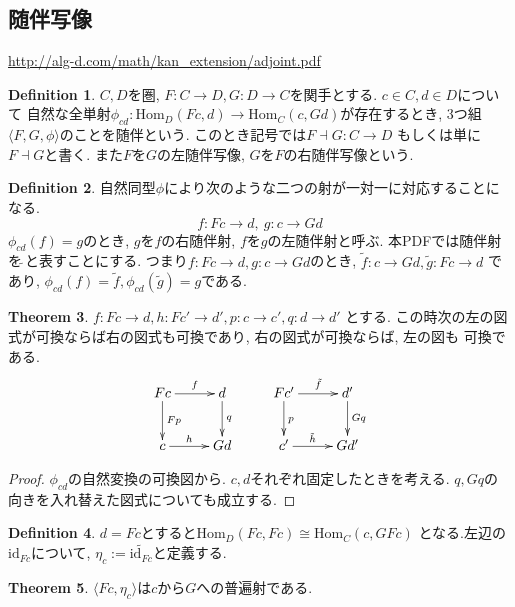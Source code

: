 \documentclass[a4paper,10pt]{article}
\theoremstyle{definition}
\newtheorem{thm}{\bfseries Theorem}[section]
\newtheorem{definition}[thm]{\bfseries Definition}
\begin{document}
\subsection{随伴写像}
\url{http://alg-d.com/math/kan_extension/adjoint.pdf}
\begin{definition}
    $C, D$を圏, $F: C \rightarrow D, G: D \rightarrow C$を関手とする. $c \in C, d \in D$について
    自然な全単射$\phi_{cd}: \mathrm{Hom}_D(Fc, d) \rightarrow \mathrm{Hom}_C(c,Gd)$が存在するとき,
    3つ組$\langle F,G,\phi \rangle$のことを随伴という. このとき記号では$F \dashv G: C \rightarrow D$
    もしくは単に$F \dashv G$と書く. また$F$を$G$の左随伴写像, $G$を$F$の右随伴写像という.
\end{definition}
\begin{definition}
    自然同型$\phi$により次のような二つの射が一対一に対応することになる.
    \[ f:Fc \rightarrow d, \ g:c \rightarrow Gd \]
    $\phi_{cd}(f) = g$のとき, $g$を$f$の右随伴射, $f$を$g$の左随伴射と呼ぶ.
    本PDFでは随伴射を$\tilde{\ }$と表すことにする. つまり$f:Fc \rightarrow d, g:
    c \rightarrow Gd$のとき, $\tilde{f}: c \rightarrow Gd, \tilde{g}: Fc \rightarrow d$
    であり, $\phi_{cd}(f) = \tilde{f}, \phi_{cd}(\tilde{g}) = g$である.
\end{definition}
\begin{thm}
    $f:Fc \rightarrow d, h:Fc' \rightarrow d', p: c \rightarrow c', q: d \rightarrow d'$
    とする. この時次の左の図式が可換ならば右の図式も可換であり, 右の図式が可換ならば, 左の図も
    可換である.
\begin{align*}
\xymatrix{
Fc \ar[r]^-{f} \ar[d]^-{Fp} & d \ar[d]^-{q}& 
Fc'\ar[r]^-{\tilde{f}} \ar[d]^{p} & d' \ar[d]^-{Gq} \\
c \ar[r]^-{h}& Gd
& c'\ar[r]^-{\tilde{h}}& Gd'
}
\end{align*}
\end{thm}
\begin{proof}
    $\phi_{cd}$の自然変換の可換図から. $c,d$それぞれ固定したときを考える.
    $q, Gq$の向きを入れ替えた図式についても成立する.
\end{proof}
\begin{definition}
    $d=Fc$とすると$\textrm{Hom}_D(Fc, Fc) \cong \textrm{Hom}_C(c, GFc)$
    となる.左辺の$\textrm{id}_{Fc}$について, $\eta_{c}:= \widetilde{\textrm{id}_{Fc}}$と定義する.
\end{definition}
\begin{thm}
    $\langle Fc, \eta_{c} \rangle$は$c$から$G$への普遍射である.
\end{thm}
\end{document}

